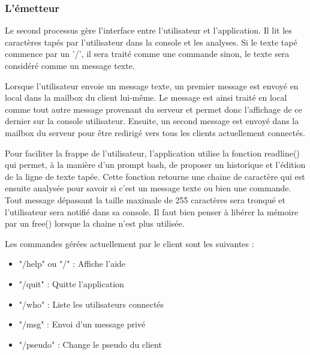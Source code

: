 \documentclass{article}
\begin{document}
	\subsubsection{L'émetteur} 
	\par Le second processus gère l'interface entre l'utilisateur et l'application. Il lit les caractères tapés par l'utilisateur dans la console et les analyses. Si le texte tapé commence par un '/', il sera traité comme une commande sinon, le texte sera considéré comme un message texte.
	\par Lorsque l'utilisateur envoie un message texte, un premier message est envoyé en local dans la mailbox du client lui-même. Le message est ainsi traité en local comme tout autre message provenant du serveur et permet donc l'affichage de ce dernier sur la console utilisateur. Ensuite, un second message est envoyé dans la mailbox du serveur pour être redirigé vers tous les clients actuellement connectés. 
	\par Pour faciliter la frappe de l'utilisateur, l'application utilise la fonction readline() qui permet, à la manière d'un prompt bash, de proposer un historique et l'édition de la ligne de texte tapée. Cette fonction retourne une chaine de caractère qui est ensuite analysée pour savoir si c'est un message texte ou bien une commande. Tout message dépassant la taille maximale de 255 caractères sera tronqué et l'utilisateur sera notifié dans sa console. Il faut bien penser à libérer la mémoire par un free() lorsque la chaine n'est plus utilisée.
	\par Les commandes gérées actuellement par le client sont les suivantes :
	\begin{itemize}\renewcommand{\labelitemi}{$\bullet$}
		\item "/help" ou "/" : Affiche l'aide
		\item "/quit"        : Quitte l'application
		\item "/who"    	 : Liste les utilisateurs connectés
		\item "/msg"    	 : Envoi d'un message privé
		\item "/pseudo" 	 : Change le pseudo du client
	\end{itemize}
\end{document}
